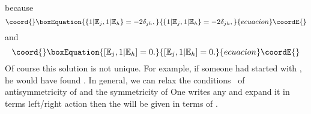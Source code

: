 \documentclass[a4paper,12pt]{book}
\begin{document}
because 
\begin{equation}\coord{}\boxEquation{
\left\{ 1|\Bbb{E}_{j},1|\Bbb{E}_{h}\right\} =-2\delta _{jh},
}{
\left\{ 1|\Bbb{E}_{j},1|\Bbb{E}_{h}\right\} =-2\delta _{jh},
}{ecuacion}\coordE{}\end{equation}
and 
\begin{equation}\coord{}\boxEquation{
\left[ \Bbb{E}_{j},1|\Bbb{E}_{h}\right] =0.
}{
\left[ \Bbb{E}_{j},1|\Bbb{E}_{h}\right] =0.
}{ecuacion}\coordE{}\end{equation}
Of course this solution is not unique. For example, if someone had started
with \coordHE{}, he would have found \coordHE{}. In general, we can relax the conditions \ of antisymmetricity of \myHighlight{$%
\Lambda $}\coordHE{} and the symmetricity of \coordHE{} One writes any \myHighlight{$\Gamma $}\coordHE{} and
expand it in terms left/right action \coordHE{} then the \myHighlight{$\Lambda $}\coordHE{} will be given in terms of \coordHE{}.
\end{document}
